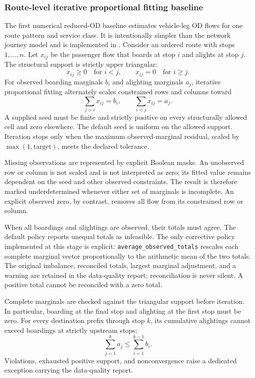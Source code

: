 \subsubsection{Route-level iterative proportional fitting baseline}
\label{sec:reduced-od-route-level-ipf}

The first numerical reduced-OD baseline estimates vehicle-leg OD flows for one
route pattern and service class.  It is intentionally simpler than the network
journey model and is implemented in
.  Consider an
ordered route with stops $1,\ldots,n$.  Let $x_{ij}$ be the passenger flow that
boards at stop $i$ and alights at stop $j$.  The structural support is strictly
upper triangular:
\[
x_{ij}\geq 0\quad\text{for }i<j,
\qquad
x_{ij}=0\quad\text{for }i\geq j.
\]
For observed boarding marginals $b_i$ and alighting marginals $a_j$, iterative
proportional fitting alternately scales constrained rows and columns toward
\[
\sum_{j>i}x_{ij}=b_i,
\qquad
\sum_{i<j}x_{ij}=a_j.
\]
A supplied seed must be finite and strictly positive on every structurally
allowed cell and zero elsewhere.  The default seed is uniform on the allowed
support.  Iteration stops only when the maximum observed-marginal residual,
scaled by $\max(1,\text{target})$, meets the declared tolerance.

Missing observations are represented by explicit Boolean masks.  An unobserved
row or column is not scaled and is not interpreted as zero; its fitted value
remains dependent on the seed and other observed constraints.  The result is
therefore marked underdetermined whenever either set of marginals is incomplete.
An explicit observed zero, by contrast, removes all flow from its constrained
row or column.

When all boardings and alightings are observed, their totals must agree.  The
default policy reports unequal totals as infeasible.  The only corrective
policy implemented at this stage is explicit:
\texttt{average\_observed\_totals} rescales each complete marginal vector
proportionally to the arithmetic mean of the two totals.  The original
imbalance, reconciled totals, largest marginal adjustment, and a warning are
retained in the data-quality report; reconciliation is never silent.  A
positive total cannot be reconciled with a zero total.

Complete marginals are checked against the triangular support before
iteration.  In particular, boarding at the final stop and alighting at the
first stop must be zero.  For every destination prefix through stop $k$, its
cumulative alightings cannot exceed boardings at strictly upstream stops:
\[
\sum_{j=1}^{k}a_j
\leq
\sum_{i=1}^{k-1}b_i.
\]
Violations, exhausted positive support, and nonconvergence raise a dedicated
exception carrying the data-quality report.

